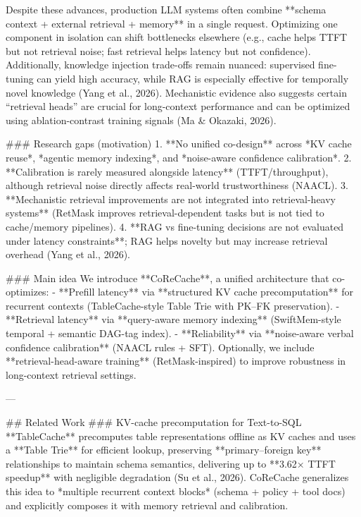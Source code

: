 Despite these advances, production LLM systems often combine **schema context + external retrieval + memory** in a single request. Optimizing one component in isolation can shift bottlenecks elsewhere (e.g., cache helps TTFT but not retrieval noise; fast retrieval helps latency but not confidence). Additionally, knowledge injection trade-offs remain nuanced: supervised fine-tuning can yield high accuracy, while RAG is especially effective for temporally novel knowledge (Yang et al., 2026). Mechanistic evidence also suggests certain “retrieval heads” are crucial for long-context performance and can be optimized using ablation-contrast training signals (Ma & Okazaki, 2026).

### Research gaps (motivation)  
1. **No unified co-design** across *KV cache reuse*, *agentic memory indexing*, and *noise-aware confidence calibration*.  
2. **Calibration is rarely measured alongside latency** (TTFT/throughput), although retrieval noise directly affects real-world trustworthiness (NAACL).  
3. **Mechanistic retrieval improvements are not integrated into retrieval-heavy systems** (RetMask improves retrieval-dependent tasks but is not tied to cache/memory pipelines).  
4. **RAG vs fine-tuning decisions are not evaluated under latency constraints**; RAG helps novelty but may increase retrieval overhead (Yang et al., 2026).  

### Main idea  
We introduce **CoReCache**, a unified architecture that co-optimizes:  
- **Prefill latency** via **structured KV cache precomputation** for recurrent contexts (TableCache-style Table Trie with PK–FK preservation).  
- **Retrieval latency** via **query-aware memory indexing** (SwiftMem-style temporal + semantic DAG-tag index).  
- **Reliability** via **noise-aware verbal confidence calibration** (NAACL rules + SFT).  
Optionally, we include **retrieval-head-aware training** (RetMask-inspired) to improve robustness in long-context retrieval settings.

---

## Related Work  
### KV-cache precomputation for Text-to-SQL  
**TableCache** precomputes table representations offline as KV caches and uses a **Table Trie** for efficient lookup, preserving **primary–foreign key** relationships to maintain schema semantics, delivering up to **3.62× TTFT speedup** with negligible degradation (Su et al., 2026). CoReCache generalizes this idea to *multiple recurrent context blocks* (schema + policy + tool docs) and explicitly composes it with memory retrieval and calibration.


